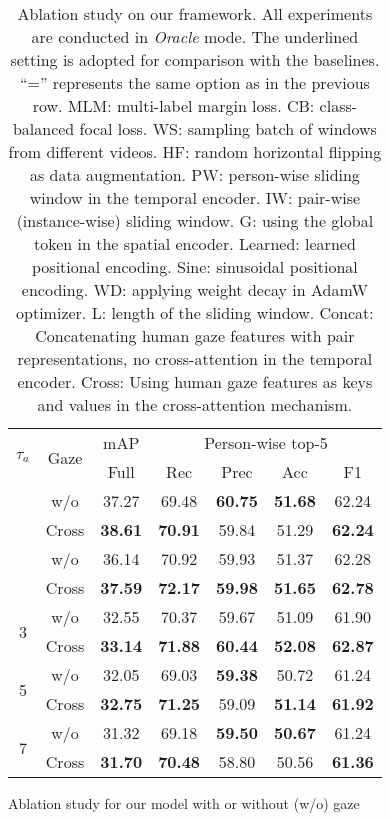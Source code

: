 \documentclass[times,twocolumn,final,authoryear]{elsarticle}
\begin{document}
\begin{table}
    \begin{subtable}[]{0.47\textwidth}
        \centering
        \small
        \begin{tabular}{|c|c|c|c c c c|}
            \hline
            \multirow{2}{*}{$\tau_a$} & \multirow{2}{*}{Gaze} & mAP & \multicolumn{4}{c|}{Person-wise top-5} \\
            \cline{3-7}
            & & Full & Rec & Prec & Acc & F1 \\
            \hhline{|=|=|=|= = = =|}
            \multirow{2}{*}{0} & w/o & 37.27 & 69.48 & \textbf{60.75} & \textbf{51.68} & 62.24 \\
            & Cross & \textbf{38.61} & \textbf{70.91} & 59.84 & 51.29 & \textbf{62.24} \\
            \hhline{|=|=|=|= = = =|}
            \multirow{2}{*}{1} & w/o & 36.14 & 70.92 & 59.93 & 51.37 & 62.28 \\
            & Cross & \textbf{37.59} & \textbf{72.17} & \textbf{59.98} & \textbf{51.65} & \textbf{62.78}\\
            \hline
            \multirow{2}{*}{3} & w/o & 32.55 & 70.37 & 59.67 & 51.09 & 61.90 \\
            & Cross & \textbf{33.14} & \textbf{71.88} & \textbf{60.44} & \textbf{52.08} & \textbf{62.87}\\
            \hline
            \multirow{2}{*}{5} & w/o & 32.05 & 69.03 & \textbf{59.38} & 50.72 & 61.24 \\
            & Cross & \textbf{32.75} & \textbf{71.25} & 59.09 & \textbf{51.14} & \textbf{61.92}\\
            \hline
            \multirow{2}{*}{7} & w/o & 31.32 & 69.18 & \textbf{59.50} & \textbf{50.67} & 61.24 \\
            & Cross & \textbf{31.70} & \textbf{70.48} & 58.80 & 50.56 & \textbf{61.36}\\
            \hline
        \end{tabular}
        \caption{Ablation study for our model with or without (w/o) gaze}
        \label{table:ablation_gaze}
    \end{subtable}
    
    \caption{Ablation study on our framework. All experiments are conducted in \emph{Oracle} mode. The underlined setting is adopted for comparison with the baselines. ``='' represents the same option as in the previous row. MLM: multi-label margin loss. CB: class-balanced focal loss. WS: sampling batch of windows from different videos. HF: random horizontal flipping as data augmentation. PW: person-wise sliding window in the temporal encoder. IW: pair-wise (instance-wise) sliding window. G: using the global token in the spatial encoder. Learned: learned positional encoding. Sine: sinusoidal positional encoding. WD: applying weight decay in AdamW optimizer. L: length of the sliding window. Concat: Concatenating human gaze features with pair representations, no cross-attention in the temporal encoder. Cross: Using human gaze features as keys and values in the cross-attention mechanism.}
    \label{table:ablation}
\end{table}
\end{document}
